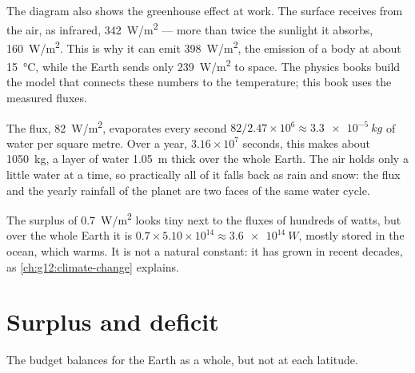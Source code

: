 The diagram also shows the greenhouse effect at work. The surface receives
from the air, as infrared, \qty{342}{W/m^2} --- more than twice the sunlight
it absorbs, \qty{160}{W/m^2}. This is why it can emit \qty{398}{W/m^2}, the
emission of a body at about \qty{15}{\degreeCelsius}, while the Earth sends
only \qty{239}{W/m^2} to space. The physics books build the model that
connects these numbers to the temperature; this book uses the measured
fluxes.

\begin{example}\label{ex:g10:earth-energy-budget:evaporation}
The  flux, \qty{82}{W/m^2}, evaporates every second $82/2.47\times
10^6 \approx \qty{3.3e-5}{kg}$ of water per square metre. Over a year,
$3.16\times10^7$ seconds, this makes about \qty{1050}{kg}, a layer of water
\qty{1.05}{m} thick over the whole Earth. The air holds only a little water
at a time, so practically all of it falls back as rain and snow: the  flux and the yearly rainfall of the planet are two faces of the same
water cycle.
\end{example}

\begin{remark}\label{rem:g10:earth-energy-budget:imbalance}
The surplus of \qty{0.7}{W/m^2} looks tiny next to the fluxes of hundreds of
watts, but over the whole Earth it is $0.7 \times 5.10\times10^{14} \approx
\qty{3.6e14}{W}$, mostly stored in the ocean, which warms. It is not a
natural constant: it has grown in recent decades, as
\cref{ch:g12:climate-change} explains.
\end{remark}

\section{Surplus and deficit}

The budget balances for the Earth as a whole, but not at each latitude.

